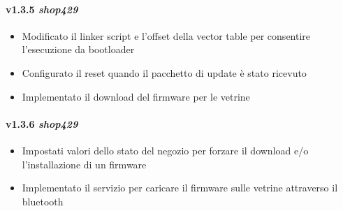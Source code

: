 \paragraph{v1.3.5 \textit{shop429}}
  \begin{itemize}
  	\item Modificato il linker script e l'offset della vector table per consentire l'esecuzione da bootloader
    \item Configurato il reset quando il pacchetto di update \`e stato ricevuto
    \item Implementato il download del firmware per le vetrine
  \end{itemize}
\paragraph{v1.3.6 \textit{shop429}}
  \begin{itemize}
  	\item Impostati valori dello stato del negozio per forzare il download e/o l'installazione di un firmware
    \item Implementato il servizio per caricare il firmware sulle vetrine attraverso il bluetooth
  \end{itemize}
